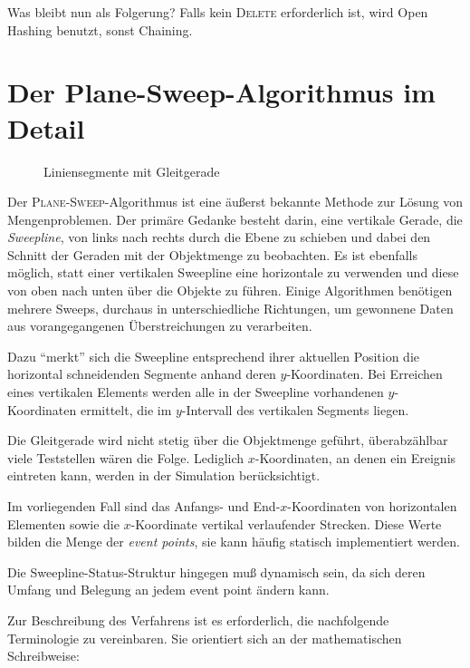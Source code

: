 \documentclass[ngerman,draft,parskip=half*,twoside]{scrreprt}
\theoremstyle{break}
\theoremstyle{nonumberbreak}
\begin{document}
Was bleibt nun als Folgerung? Falls kein \textsc{Delete} erforderlich ist, wird Open Hashing benutzt, sonst Chaining.

\appendix    %

\chapter{Der Plane-Sweep-Algorithmus im Detail}
\label{planesweep}

\begin{figure}
  \centering  
  \caption{Liniensegmente mit Gleitgerade}
  \label{131003d}
\end{figure}

Der \textsc{Plane-Sweep}-Algorithmus ist eine äußerst bekannte
Methode zur Lösung von Mengenproblemen. Der primäre Gedanke
besteht darin, eine vertikale Gerade, die \textit{Sweepline}, von
links nach rechts durch die Ebene zu schieben und dabei den
Schnitt der Geraden mit der Objektmenge zu beobachten. Es
ist ebenfalls möglich, statt einer vertikalen Sweepline eine
horizontale zu verwenden und diese von oben nach unten über die
Objekte zu führen. Einige Algorithmen benötigen mehrere Sweeps,
durchaus in unterschiedliche Richtungen, um gewonnene Daten aus
vorangegangenen Überstreichungen zu verarbeiten.

Dazu "`merkt"' sich die Sweepline entsprechend ihrer aktuellen
Position die horizontal schneidenden Segmente anhand deren
$y$-Koordinaten. Bei Erreichen eines vertikalen Elements
werden alle in der Sweepline vorhandenen $y$-Koordinaten
ermittelt, die im $y$-Intervall des vertikalen Segments
liegen.

Die Gleitgerade wird nicht stetig über die Objektmenge
geführt, überabzählbar viele Teststellen wären die Folge. 
Lediglich $x$-Koordinaten, an denen ein Ereignis
eintreten kann, werden in der Simulation berücksichtigt.

Im vorliegenden Fall sind das Anfangs- und End-$x$-Koordinaten von
horizontalen Elementen sowie die $x$-Koordinate 
vertikal verlaufender Strecken. Diese Werte bilden die Menge
der \textit{event points}, sie kann häufig statisch implementiert werden.

Die Sweepline-Status-Struktur hingegen muß dynamisch sein, da sich
deren Umfang und Belegung an jedem event point ändern kann.

Zur Beschreibung des Verfahrens ist es erforderlich, die nachfolgende
Terminologie zu vereinbaren. Sie orientiert sich an der mathematischen
Schreibweise:
\end{document}
